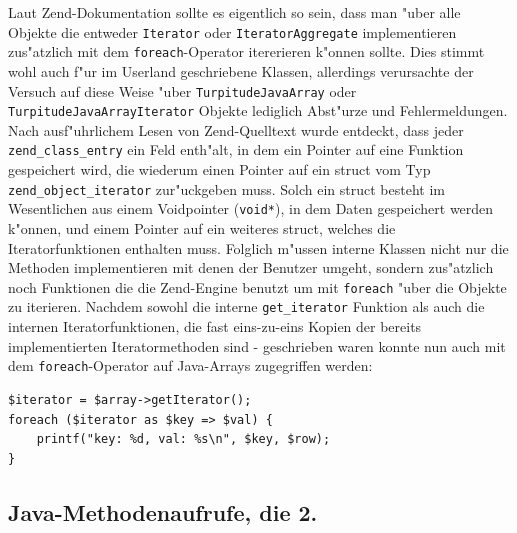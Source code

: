 Laut Zend-Dokumentation sollte es eigentlich so sein, dass man "uber alle Objekte die entweder \texttt{Iterator} oder \texttt{IteratorAggregate} implementieren zus"atzlich mit
dem \texttt{foreach}-Operator itererieren k"onnen sollte. Dies stimmt wohl auch f"ur im Userland geschriebene Klassen, allerdings verursachte der Versuch auf diese Weise
"uber \texttt{TurpitudeJavaArray} oder \texttt{TurpitudeJavaArrayIterator} Objekte lediglich Abst"urze und Fehlermeldungen. Nach ausf"uhrlichem Lesen von Zend-Quelltext
wurde entdeckt, dass jeder \texttt{zend\_class\_entry} ein Feld enth"alt, in dem ein Pointer auf eine Funktion gespeichert wird, die wiederum einen Pointer auf ein struct vom Typ
\texttt{zend\_object\_iterator} zur"uckgeben muss. Solch ein struct besteht im Wesentlichen aus einem Voidpointer (\texttt{void*}), in dem Daten gespeichert werden k"onnen, und
einem Pointer auf ein weiteres struct, welches die Iteratorfunktionen enthalten muss. Folglich m"ussen interne Klassen nicht nur die Methoden implementieren mit denen der
Benutzer umgeht, sondern zus"atzlich noch Funktionen die die Zend-Engine benutzt um mit \texttt{foreach} "uber die Objekte zu iterieren. Nachdem sowohl die interne
\texttt{get\_iterator} Funktion als auch die internen Iteratorfunktionen, die fast eins-zu-eins Kopien der bereits implementierten Iteratormethoden sind - geschrieben waren
konnte nun auch mit dem \texttt{foreach}-Operator auf Java-Arrays zugegriffen werden:

\begin{lstlisting}[caption=Java-Array und foreach]
$iterator = $array->getIterator();
foreach ($iterator as $key => $val) {
    printf("key: %d, val: %s\n", $key, $row);
}
\end{lstlisting}

\subsection{Java-Methodenaufrufe, die 2.}
\label{sec:chap1:impl:12}

